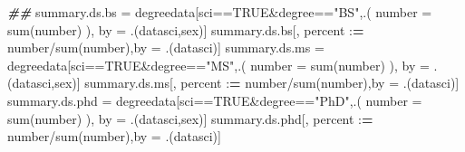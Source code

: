 \documentclass[
  12pt,
]{article}
\newenvironment{Shaded}{\begin{snugshade}}{\end{snugshade}}
\newcommand{\AttributeTok}[1]{\textcolor[rgb]{0.77,0.63,0.00}{#1}}
\newcommand{\ConstantTok}[1]{\textcolor[rgb]{0.00,0.00,0.00}{#1}}
\newcommand{\DocumentationTok}[1]{\textcolor[rgb]{0.56,0.35,0.01}{\textbf{\textit{#1}}}}
\newcommand{\ErrorTok}[1]{\textcolor[rgb]{0.64,0.00,0.00}{\textbf{#1}}}
\newcommand{\FunctionTok}[1]{\textcolor[rgb]{0.00,0.00,0.00}{#1}}
\newcommand{\NormalTok}[1]{#1}
\newcommand{\OtherTok}[1]{\textcolor[rgb]{0.56,0.35,0.01}{#1}}
\newcommand{\SpecialCharTok}[1]{\textcolor[rgb]{0.00,0.00,0.00}{#1}}
\newcommand{\StringTok}[1]{\textcolor[rgb]{0.31,0.60,0.02}{#1}}
\begin{document}
\begin{Shaded}
\begin{Highlighting}[]
\DocumentationTok{\#\# }
\NormalTok{summary.ds.bs }\OtherTok{=}\NormalTok{ degreedata[sci}\SpecialCharTok{==}\ConstantTok{TRUE}\SpecialCharTok{\&}\NormalTok{degree}\SpecialCharTok{==}\StringTok{"BS"}\NormalTok{,.(}
  \AttributeTok{number =} \FunctionTok{sum}\NormalTok{(number)}
\NormalTok{), by }\OtherTok{=}\NormalTok{ .(datasci,sex)]}
\NormalTok{summary.ds.bs[, percent }\SpecialCharTok{:}\ErrorTok{=}\NormalTok{ number}\SpecialCharTok{/}\FunctionTok{sum}\NormalTok{(number),by }\OtherTok{=}\NormalTok{ .(datasci)]}
\NormalTok{summary.ds.ms }\OtherTok{=}\NormalTok{ degreedata[sci}\SpecialCharTok{==}\ConstantTok{TRUE}\SpecialCharTok{\&}\NormalTok{degree}\SpecialCharTok{==}\StringTok{"MS"}\NormalTok{,.(}
  \AttributeTok{number =} \FunctionTok{sum}\NormalTok{(number)}
\NormalTok{), by }\OtherTok{=}\NormalTok{ .(datasci,sex)]}
\NormalTok{summary.ds.ms[, percent }\SpecialCharTok{:}\ErrorTok{=}\NormalTok{ number}\SpecialCharTok{/}\FunctionTok{sum}\NormalTok{(number),by }\OtherTok{=}\NormalTok{ .(datasci)]}
\NormalTok{summary.ds.phd }\OtherTok{=}\NormalTok{ degreedata[sci}\SpecialCharTok{==}\ConstantTok{TRUE}\SpecialCharTok{\&}\NormalTok{degree}\SpecialCharTok{==}\StringTok{"PhD"}\NormalTok{,.(}
  \AttributeTok{number =} \FunctionTok{sum}\NormalTok{(number)}
\NormalTok{), by }\OtherTok{=}\NormalTok{ .(datasci,sex)]}
\NormalTok{summary.ds.phd[, percent }\SpecialCharTok{:}\ErrorTok{=}\NormalTok{ number}\SpecialCharTok{/}\FunctionTok{sum}\NormalTok{(number),by }\OtherTok{=}\NormalTok{ .(datasci)]}


\end{Highlighting}
\end{Shaded}
\end{document}

